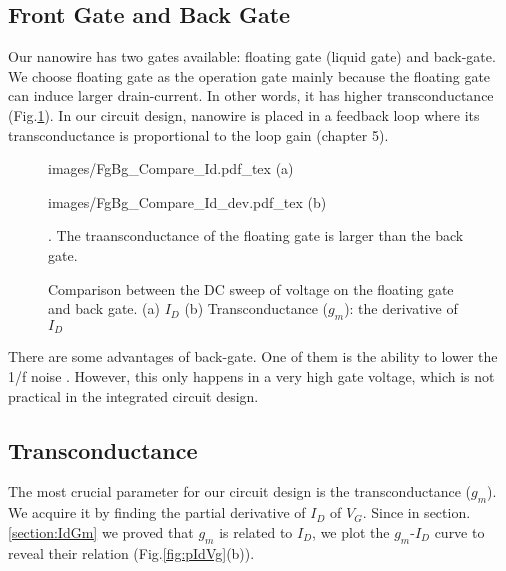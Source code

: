 \subsection{Front Gate and Back Gate}
Our nanowire has two gates available: floating gate (liquid gate) and back-gate.
We choose floating gate as the operation gate mainly because the floating gate can induce larger drain-current.
In other words, it has higher transconductance (Fig.\ref{fig:IdVgandgbsId}).
In our circuit design, nanowire is placed in a feedback loop where its transconductance is proportional to the loop gain (chapter 5).

\begin{figure}[!htbp]
    \centering
    \begin{minipage}[t][0.1\textheight]{0.4\textheight}
        \centering
        \def\svgwidth{14cm}
        \fontsize{6}{15}\selectfont
         {images/FgBg_Compare_Id.pdf_tex}
        (a)
    \end{minipage}
    \hfill
    \begin{minipage}[t][0.1\textheight]{0.4\textheight}
        \centering
        \def\svgwidth{14cm}
        \fontsize{6}{15}\selectfont
         {images/FgBg_Compare_Id_dev.pdf_tex}
        (b)
    \end{minipage}
    \caption{Comparison between the DC sweep of voltage on the floating gate and back gate. (a) $I_D$ (b) Transconductance ($g_m$): the derivative of $I_D$}. The traansconductance of the floating gate is larger than the back gate.
    \label{fig:IdVgandgbsId}
\end{figure}


There are some advantages of back-gate.
One of them is the ability to lower the 1/f noise \cite{C7, C8}.
However, this only happens in a very high gate voltage, which is not practical in the integrated circuit design.

\subsection{Transconductance}
The most crucial parameter for our circuit design is the transconductance ($g_m$).
We acquire it by finding the partial derivative of $I_D$ of $V_{G}$.
Since in section.\ref{section:IdGm} we proved that $g_m$ is related to $I_D$, we plot the $g_m$-$I_D$ curve to reveal their relation (Fig.\ref{fig:pIdVg}(b)).

